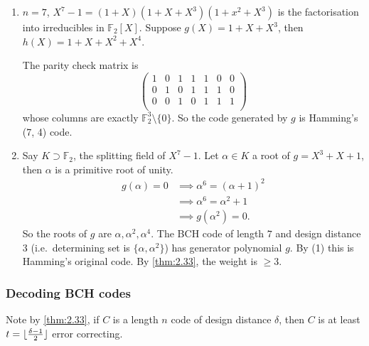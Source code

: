 \documentclass{article}
\DeclarePairedDelimiter{\floor}{\lfloor}{\rfloor}
\newcommand{\F}{\mathbb{F}}
\newcommand{\1}[1]{\mathbbm{1}_{#1}}
\begin{document}
\begin{eg}
    \begin{enumerate}[label=(\arabic*)]
        \item $n = 7$, $X^7 - 1 = (1+X)(1 + X + X^3)(1 + x^2 + X^3)$ is the factorisation into irreducibles in $\F_2[X]$.
            Suppose $g(X) = 1 + X + X^3$, then $h(X) = 1 + X + X^2 + X^4$.

            The parity check matrix is
            \begin{equation*}
                \begin{pmatrix}
                    1 & 0 & 1 & 1 & 1 & 0 & 0 \\
                    0 & 1 & 0 & 1 & 1 & 1 & 0 \\
                    0 & 0 & 1 & 0 & 1 & 1 & 1 \\
                \end{pmatrix}
            \end{equation*}
            whose columns are exactly $\F_2^3 \setminus \{0\}$.
            So the code generated by $g$ is Hamming's (7, 4) code.
        \item Say $K \supset \F_2$, the splitting field of $X^7 - 1$.
            Let $\alpha \in K$ a root of $g = X^3 + X + 1$, then $\alpha$ is a primitive root of unity.
            \begin{align*}
                g(\alpha) = 0 &\implies \alpha^6 = (\alpha+1)^2 \\
                              &\implies \alpha^6 = \alpha^2 + 1 \\
                              &\implies g(\alpha^2) = 0.
            \end{align*}
            So the roots of $g$ are $\alpha, \alpha^2, \alpha^4$.
            The BCH code of length $7$ and design distance $3$ (i.e.\ determining set is $\{\alpha, \alpha^2\}$) has generator polynomial $g$.
            By (1) this is Hamming's original code. By \cref{thm:2.33}, the weight is $\geq 3$.
    \end{enumerate}
\end{eg}
\subsubsection*{Decoding BCH codes}
Note by \cref{thm:2.33}, if $C$ is a length $n$ code of design distance $\delta$, then $C$ is at least $t = \floor{\frac{\delta - 1}{2}}$ error correcting.
\end{document}
